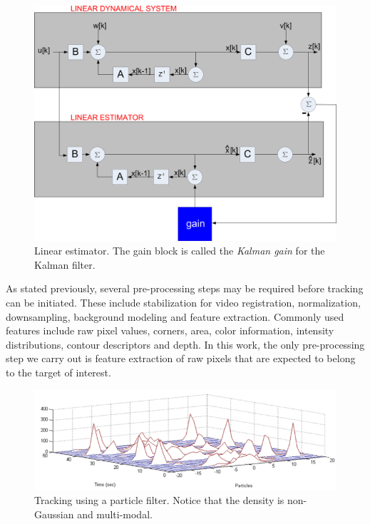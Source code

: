 								\begin{figure}[t]
								\center
								\includegraphics[width=1.0\textwidth]{thesis/TRK_LinearEstimator_blockDiagram.pdf}
								\caption{Linear estimator.  The gain block is called the \emph{Kalman gain} for the Kalman filter.}
								\label{TRK_overviewDiagram}
								\end{figure}

As stated previously, several pre-processing steps may be required before tracking can be initiated.  These include stabilization for video registration, normalization, downsampling, background modeling and feature extraction.  Commonly used features include raw pixel values, corners, area, color information, intensity distributions, contour descriptors and depth.  In this work, the only pre-processing step we carry out is feature extraction of raw pixels that are expected to belong to the target of interest.

								\begin{figure}[t]
								\center
								\includegraphics[width=1.0\textwidth]{thesis/TRK_ParticleFilter_multimodalPDF_part.png}
								\caption{Tracking using a particle filter.  Notice that the density is non-Gaussian and multi-modal.}
								\label{fig:particle_filter_multi_modal_density}
								\end{figure}



